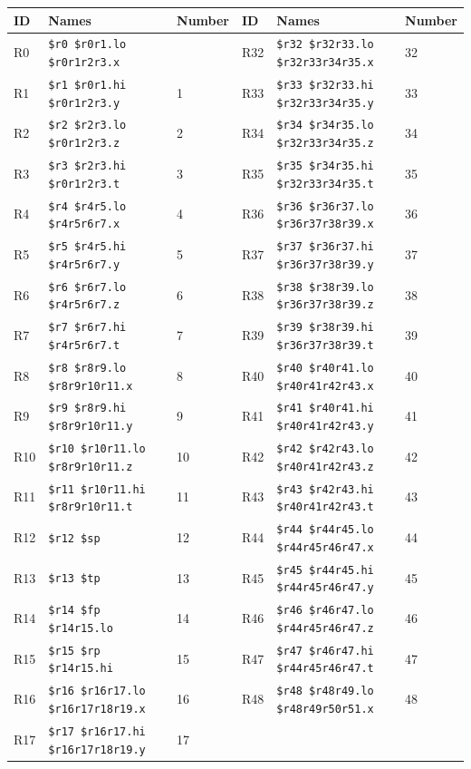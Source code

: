 \begin{table}
\begin{center}
{\small
\begin{tabular}{|l|l|l||l|l|l|} \hline
ID & Names & Number & ID & Names & Number \\ \hline
R0 & \verb|$r0 $r0r1.lo $r0r1r2r3.x| &  &
R32 & \verb|$r32 $r32r33.lo $r32r33r34r35.x| & 32 \\
R1 & \verb|$r1 $r0r1.hi $r0r1r2r3.y| & 1 &
R33 & \verb|$r33 $r32r33.hi $r32r33r34r35.y| & 33 \\
R2 & \verb|$r2 $r2r3.lo $r0r1r2r3.z| & 2 &
R34 & \verb|$r34 $r34r35.lo $r32r33r34r35.z| & 34 \\
R3 & \verb|$r3 $r2r3.hi $r0r1r2r3.t| & 3 &
R35 & \verb|$r35 $r34r35.hi $r32r33r34r35.t| & 35 \\
R4 & \verb|$r4 $r4r5.lo $r4r5r6r7.x| & 4 &
R36 & \verb|$r36 $r36r37.lo $r36r37r38r39.x| & 36 \\
R5 & \verb|$r5 $r4r5.hi $r4r5r6r7.y| & 5 &
R37 & \verb|$r37 $r36r37.hi $r36r37r38r39.y| & 37 \\
R6 & \verb|$r6 $r6r7.lo $r4r5r6r7.z| & 6 &
R38 & \verb|$r38 $r38r39.lo $r36r37r38r39.z| & 38 \\
R7 & \verb|$r7 $r6r7.hi $r4r5r6r7.t| & 7 &
R39 & \verb|$r39 $r38r39.hi $r36r37r38r39.t| & 39 \\
R8 & \verb|$r8 $r8r9.lo $r8r9r10r11.x| & 8 &
R40 & \verb|$r40 $r40r41.lo $r40r41r42r43.x| & 40 \\
R9 & \verb|$r9 $r8r9.hi $r8r9r10r11.y| & 9 &
R41 & \verb|$r41 $r40r41.hi $r40r41r42r43.y| & 41 \\
R10 & \verb|$r10 $r10r11.lo $r8r9r10r11.z| & 10 &
R42 & \verb|$r42 $r42r43.lo $r40r41r42r43.z| & 42 \\
R11 & \verb|$r11 $r10r11.hi $r8r9r10r11.t| & 11 &
R43 & \verb|$r43 $r42r43.hi $r40r41r42r43.t| & 43 \\
R12 & \verb|$r12 $sp| & 12 &
R44 & \verb|$r44 $r44r45.lo $r44r45r46r47.x| & 44 \\
R13 & \verb|$r13 $tp| & 13 &
R45 & \verb|$r45 $r44r45.hi $r44r45r46r47.y| & 45 \\
R14 & \verb|$r14 $fp $r14r15.lo| & 14 &
R46 & \verb|$r46 $r46r47.lo $r44r45r46r47.z| & 46 \\
R15 & \verb|$r15 $rp $r14r15.hi| & 15 &
R47 & \verb|$r47 $r46r47.hi $r44r45r46r47.t| & 47 \\
R16 & \verb|$r16 $r16r17.lo $r16r17r18r19.x| & 16 &
R48 & \verb|$r48 $r48r49.lo $r48r49r50r51.x| & 48 \\
R17 & \verb|$r17 $r16r17.hi $r16r17r18r19.y| & 17 &

\end{tabular}}
\end{center}
\end{table}
